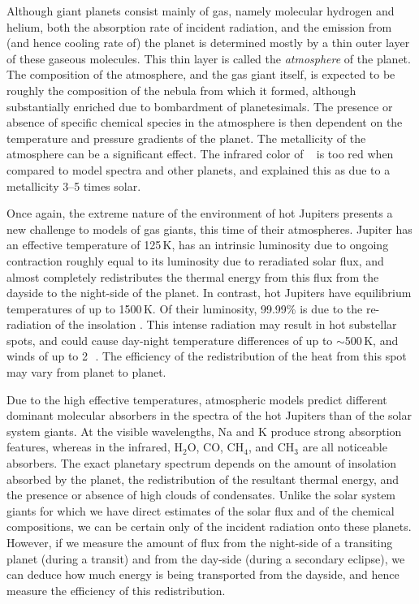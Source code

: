 Although giant planets consist mainly of gas, namely molecular hydrogen and helium, both the absorption rate of incident radiation, and the emission from (and hence cooling rate of) the planet is determined mostly by a thin outer layer of these gaseous molecules.
This thin layer is called the {\it atmosphere} of the planet.
The composition of the atmosphere, and the gas giant itself, is expected to be roughly the composition of the nebula from which it formed, although substantially enriched due to bombardment of planetesimals. 
The presence or absence of specific chemical species in the atmosphere is then dependent on the temperature and pressure gradients of the planet. 
The metallicity of the atmosphere can be a significant effect.
The infrared color of \tresOne~\citep{Charbonneau_Allen_Megeath:apj:2005a} is too red when compared to model spectra and other planets, and \citet{Fortney_Marley_Lodders:apjl:2005a} explained this as due to a metallicity 3--5 times solar. 

Once again, the extreme nature of the environment of hot Jupiters presents a new challenge to models of gas giants, this time of their atmospheres.
Jupiter has an effective temperature of 125\,K, has an intrinsic luminosity due to ongoing contraction roughly equal to its luminosity due to reradiated solar flux, and almost completely redistributes the thermal energy from this flux from the dayside to the night-side of the planet.
In contrast, hot Jupiters have equilibrium temperatures of up to 1500\,K.
Of their luminosity, 99.99\% is due to the re-radiation of the insolation \citep{Marley_Fortney_Seager:PPV:2007a}. 
This intense radiation may result in hot substellar spots, and could cause day-night temperature differences of up to $\sim$500\,K, and winds of up to 2\,\kms~\citep{Showman_Guillot:aa:2002a}.
The efficiency of the redistribution of the heat from this spot may vary from planet to planet. 

Due to the high effective temperatures, atmospheric models predict different dominant molecular absorbers in the spectra of the hot Jupiters than of the solar system giants. 
At the visible wavelengths, Na and K produce strong absorption features, whereas in the infrared, H$_2$O, CO, CH$_4$, and CH$_3$ are all noticeable absorbers. 
The exact planetary spectrum depends on the amount of insolation absorbed by the planet, the redistribution of the resultant thermal energy, and the presence or absence of high clouds of condensates. 
Unlike the solar system giants for which we have direct estimates of the solar flux and of the chemical compositions, we can be certain only of the incident radiation onto these planets.
However, if we measure the amount of flux from the night-side of a transiting planet (during a transit) and from the day-side (during a secondary eclipse), we can deduce how much energy is being transported from the dayside, and hence measure the efficiency of this redistribution. 

